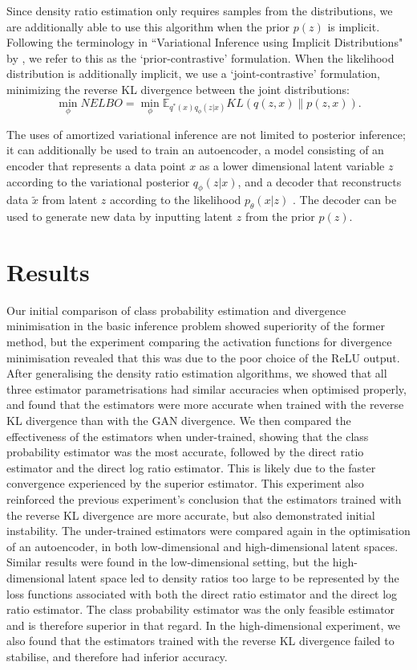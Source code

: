 \documentclass[honours,12pt]{unswthesis}
\newcommand{\E}{\mathbb{E}}
\numberwithin{equation}{section}
\theoremstyle{definition}
\begin{document}
Since density ratio estimation only requires samples from the distributions, we are additionally able to use this algorithm when the prior $p(z)$ is implicit. Following the terminology in ``Variational Inference using Implicit Distributions" by \citet{huszar}, we refer to this as the `prior-contrastive' formulation. When the likelihood distribution is additionally implicit, we use a `joint-contrastive' formulation, minimizing the reverse KL divergence between the joint distributions:
\[\min_\phi NELBO = \min_\phi \E_{q^*(x)q_\phi(z|x)}KL(q(z,x)\|p(z,x)).\]

The uses of amortized variational inference are not limited to posterior inference; it can additionally be used to train an autoencoder, a model consisting of an encoder that represents a data point $x$ as a lower dimensional latent variable $z$ according to the variational posterior $q_\phi(z|x)$, and a decoder that reconstructs data $\tilde{x}$ from latent $z$ according to the likelihood $p_\theta(x|z)$ \citep{kingma}. The decoder can be used to generate new data by inputting latent $z$ from the prior $p(z)$.
\section{Results}
Our initial comparison of class probability estimation and divergence minimisation in the basic inference problem showed superiority of the former method, but the experiment comparing the activation functions for divergence minimisation revealed that this was due to the poor choice of the ReLU output. After generalising the density ratio estimation algorithms, we showed that all three estimator parametrisations had similar accuracies when optimised properly, and found that the estimators were more accurate when trained with the reverse KL divergence than with the GAN divergence. We then compared the effectiveness of the estimators when under-trained, showing that the class probability estimator was the most accurate, followed by the direct ratio estimator and the direct log ratio estimator. This is likely due to the faster convergence experienced by the superior estimator. This experiment also reinforced the previous experiment's conclusion that the estimators trained with the reverse KL divergence are more accurate, but also demonstrated initial instability. The under-trained estimators were compared again in the optimisation of an autoencoder, in both low-dimensional and high-dimensional latent spaces. Similar results were found in the low-dimensional setting, but the high-dimensional latent space led to density ratios too large to be represented by the loss functions associated with both the direct ratio estimator and the direct log ratio estimator. The class probability estimator was the only feasible estimator and is therefore superior in that regard. In the high-dimensional experiment, we also found that the estimators trained with the reverse KL divergence failed to stabilise, and therefore had inferior accuracy.
\end{document}
